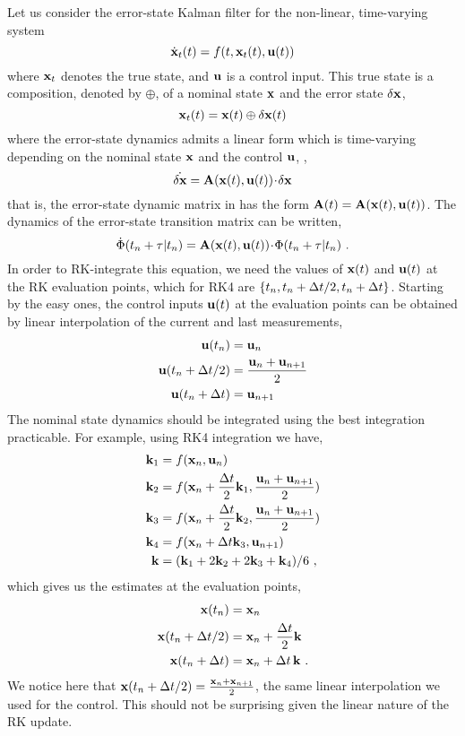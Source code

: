 Let us consider the error-state Kalman filter for the non-linear, time-varying system
%
\begin{equation}
\dot{{\bf x}}_t(t) = f(t, {\bf x}_t(t), {\bf u}(t))
\end{equation}
%
where ${\bf x}_t$ denotes the true state, and ${\bf u}$ is a control input. 
This true state is a composition, denoted by $\oplus$, of a nominal state ${\bf x}$ and the error state $\delta{\bf x}$,
%
\begin{equation}
{\bf x}_t(t) = {\bf x}(t) \oplus \delta{\bf x}(t)
\end{equation}
%
where the error-state dynamics admits a linear form which is time-varying depending on the nominal state ${\bf x}$ and the control ${\bf u}$, \ie,
%
\begin{equation}
\dot{\delta{\bf x}} = {\bf A}({\bf x}(t),{\bf u}(t))\!\cdot\!\delta{\bf x}
\end{equation}
%
that is, the error-state dynamic matrix in  has the form ${\bf A}(t) = {\bf A}({\bf x}(t),{\bf u}(t))$. 
The dynamics of the error-state transition matrix can be written,
%
\begin{equation}
\dot{\Phi}(t_n+\tau|t_n)={\bf A}({\bf x}(t),{\bf u}(t))\!\cdot\!\Phi(t_n+\tau|t_n)~.
\end{equation}
%
In order to RK-integrate this equation, we need the values of ${\bf x}(t)$ and ${\bf u}(t)$ at the RK evaluation points, which for RK4 are $\{t_n,t_n+\Delta t/2,t_n+\Delta t\}$. 
Starting by the easy ones, the control inputs ${\bf u}(t)$ at the evaluation points can be obtained by linear interpolation of the current and last measurements,
%
%
\begin{align}
{\bf u}(t_n) &= {\bf u}_n\\
{\bf u}(t_n+\Delta t/2) &= \frac{{\bf u}_n+{\bf u}_{n+1}}{2} \\
{\bf u}(t_n+\Delta t) &= {\bf u}_{n+1}
\end{align}%
%
The nominal state dynamics should be integrated using the best integration practicable. 
For example, using RK4 integration we have,
%
%
\begin{align*}
{\bf k}_1 &= f({\bf x}_n,{\bf u}_n) \nonumber \\
{\bf k}_2 &= f({\bf x}_n+\frac{\Delta t}{2}{\bf k}_1,\frac{{\bf u}_n+{\bf u}_{n+1}}{2}) \nonumber\\
{\bf k}_3 &= f({\bf x}_n+\frac{\Delta t}{2}{\bf k}_2,\frac{{\bf u}_n+{\bf u}_{n+1}}{2}) \nonumber\\
{\bf k}_4 &= f({\bf x}_n+\Delta t{\bf k}_3,{\bf u}_{n+1}) \nonumber\\
{\bf k} &= ({\bf k}_1+2{\bf k}_2+2{\bf k}_3+{\bf k}_4)/6 ~,
\end{align*}%
%
which gives us the estimates at the evaluation points,
%
%
\begin{align}
{\bf x}(t_n) &= {\bf x}_n \\
{\bf x}(t_n+\Delta t/2) &= {\bf x}_n+\frac{\Delta t}{2}{\bf k}\\
{\bf x}(t_n+\Delta t) &= {\bf x}_n+\Delta t\,{\bf k} ~.
\end{align}%
%
We notice here that ${\bf x}(t_n+\Delta t/2)=\frac{{\bf x}_n+{\bf x}_{n+1}}{2}$, the same linear interpolation we used for the control. 
This should not be surprising given the linear nature of the RK update.

